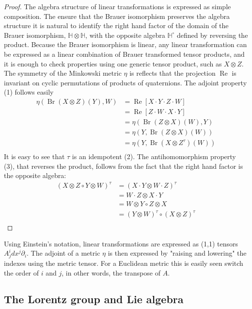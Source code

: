 \documentclass{article}
\newcommand{\HH}{\mathbb{H}}
\renewcommand{\Re}{\operatorname{Re}}
\newcommand{\Br}{\operatorname{Br}}
\begin{document}
\begin{proof}
  The algebra structure of linear transformations is expressed as simple composition.
  The ensure that the Brauer isomorphism preserves the algebra structure it is natural to identify the right hand factor of the domain of the Brauer isomorphism, $\HH\otimes\HH$, with the opposite algebra $\HH^\circ$ defined by reversing the product.
  Because the Brauer isomorphism is linear, any linear transformation can be expressed as a linear combination of Brauer transformed tensor products, and it is enough to check properties using one generic tensor product, such as $X\otimes Z$.
  The symmetry of the Minkowski metric $\eta$ is reflects that the projection $\Re$ is invariant on cyclic permutations of products of quaternions.
  The adjoint property (1) follows easily
  \begin{align*}
    \eta(\Br(X\otimes Z)(Y), W) &= \Re[X\cdot Y\cdot Z\cdot W] \\
     &= \Re[Z\cdot W\cdot X\cdot Y] \\
     &= \eta(\Br(Z\otimes X)( W), Y)  \\
     &= \eta(Y, \Br(Z\otimes X) (W)) \\
     &= \eta(Y, \Br(X\otimes Z^\tau) (W)) \\
  \end{align*}
  It is easy to see that $\tau$ is an idempotent (2).
  The antihomomorphism property (3), that reverses the product, follows from the fact that the right hand factor is the opposite algebra:
  \begin{align*}
  (X\otimes Z \circ Y \otimes W)^\tau
   &= (X \cdot Y \otimes W \cdot Z)^\tau \\
   &= W \cdot Z \otimes X \cdot Y \\
   &= W \otimes Y \circ Z \otimes X  \\
    &= (Y \otimes W)^\tau \circ (X \otimes Z)^\tau  \\
\end{align*}
\end{proof}

Using Einstein's notation, linear transformations are expressed as (1,1) tensors $A^i_jdx^j\partial_i$.
The adjoint of a metric $\eta$ is then expressed by "raising and lowering" the indexes using the metric tensor.
For a Euclidean metric this is easily seen switch the order of $i$ and $j$, in other words, the transpose of $A$.

\subsection{The Lorentz group and Lie algebra}
\end{document}
